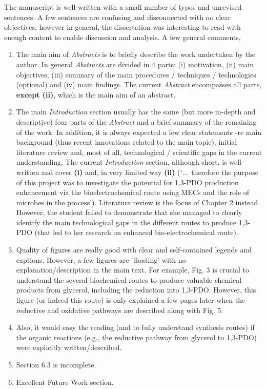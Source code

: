 \documentclass[14pt,twoside]{report}
\begin{document}
The manuscript is well-written with a small number of typos and unrevised sentences. A few sentences are confusing and disconnected with no clear objectives, however in general, the dissertation was interesting to read with enough content to enable discussion and analysis. A few general comments,
\begin{enumerate}
\item The main aim of {\it Abstracts} is to briefly describe the work undertaken by the author. In general {\it Abstracts} are divided in 4 parts: (i) motivation, (ii) main objectives, (iii) summary of the main procedures / techniques / technologies (optional) and (iv) main findings. The current {\it Abstract} encompasses all parts, {\bf except (ii)}, which is the main aim of an abstract.
%
\item The main {\it Introduction} section usually has the same (but more in-depth and descriptive) four parts of the {\it Abstract} and a brief summary of the remaining of the work. In addition, it is always expected a few clear statements -re main background (thus recent innovations related to the main topic), initial literature review and, most of all, technological / scientific gaps in the current understanding. The current {\it Introduction} section, although short, is well-written and cover {\bf (i)} and, in very limited way {\bf (ii)} ($\lq$... therefore the purpose of this project was to investigate the potential for 1,3-PDO production enhancement via the bioelectrochemical route using MECs and the role of microbes in the process'). Literature review is the focus of Chapter 2 instead. However, the student failed to demonstrate that she managed to clearly identify the main technological gaps in the different routes to produce 1,3-PDO (that led to her research on enhanced bio-electrochemical route).
%
\item Quality of figures are really good with clear and self-contained legends and captions. However, a few figures are $\lq$floating' with no explanation/description in the main text. For example, Fig. 3 is crucial to understand the several biochemical routes to produce valuable chemical products from glycerol, including the reduction into 1,3-PDO. However, this figure (or indeed this route) is only explained a few pages later when the reductive and oxidative pathways are described along with Fig. 5.
%
\item Also, it would easy the reading (and to fully understand synthesis routes) if the organic reactions (e.g., the reductive pathway from glycerol to 1,3-PDO) were explicitly written/described.  
%
\item Section 6.3 is incomplete.
%
\item Excellent Future Work section.
\end{enumerate}
\end{document}
